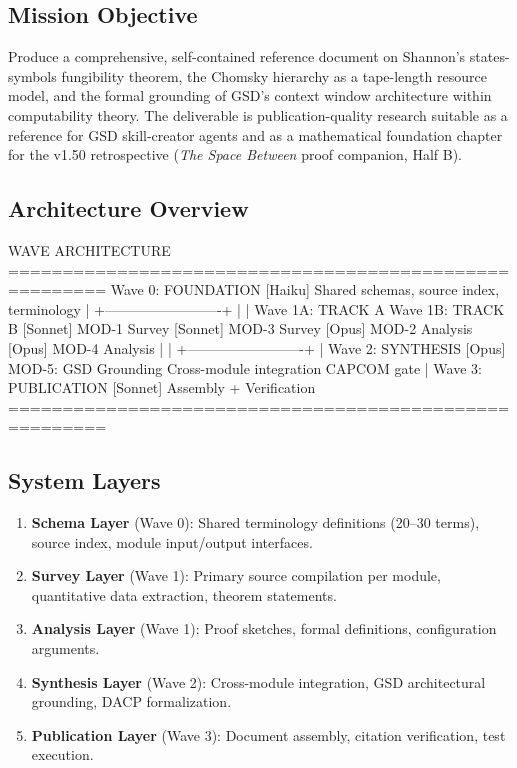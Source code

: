 \documentclass[11pt,letterpaper]{article}
\begin{document}
\subsection{Mission Objective}

Produce a comprehensive, self-contained reference document on Shannon's states-symbols fungibility theorem, the Chomsky hierarchy as a tape-length resource model, and the formal grounding of GSD's context window architecture within computability theory. The deliverable is publication-quality research suitable as a reference for GSD skill-creator agents and as a mathematical foundation chapter for the v1.50 retrospective (\textit{The Space Between} proof companion, Half B).

\subsection{Architecture Overview}

\begin{asciibox}
WAVE ARCHITECTURE
=======================================================
  Wave 0: FOUNDATION
  [Haiku] Shared schemas, source index, terminology
     |
     +-------------------------+
     |                         |
  Wave 1A: TRACK A          Wave 1B: TRACK B
  [Sonnet] MOD-1 Survey     [Sonnet] MOD-3 Survey
  [Opus]   MOD-2 Analysis   [Opus]   MOD-4 Analysis
     |                         |
     +-------------------------+
                 |
          Wave 2: SYNTHESIS
          [Opus] MOD-5: GSD Grounding
          Cross-module integration
          CAPCOM gate
                 |
          Wave 3: PUBLICATION
          [Sonnet] Assembly + Verification
=======================================================
\end{asciibox}

\subsection{System Layers}

\begin{enumerate}
  \item \textbf{Schema Layer} (Wave 0): Shared terminology definitions (20--30 terms), source index, module input/output interfaces.
  \item \textbf{Survey Layer} (Wave 1): Primary source compilation per module, quantitative data extraction, theorem statements.
  \item \textbf{Analysis Layer} (Wave 1): Proof sketches, formal definitions, configuration arguments.
  \item \textbf{Synthesis Layer} (Wave 2): Cross-module integration, GSD architectural grounding, DACP formalization.
  \item \textbf{Publication Layer} (Wave 3): Document assembly, citation verification, test execution.
\end{enumerate}
\end{document}
